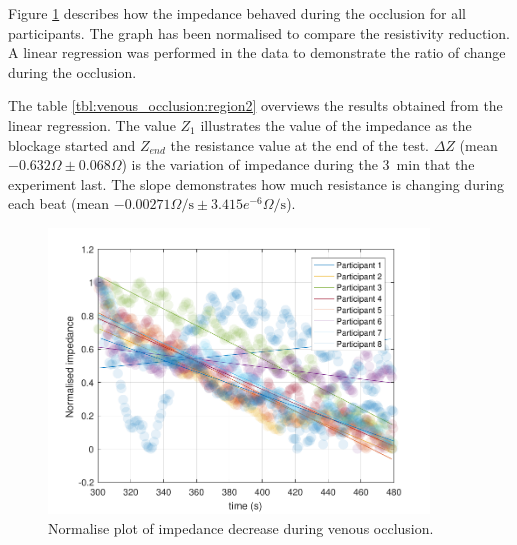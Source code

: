 Figure \ref{fig:normalise:venous_occlusion} describes how the impedance behaved during the occlusion for all participants. The graph has been normalised to compare the resistivity reduction.  A linear regression was performed in the data to demonstrate the ratio of change during the occlusion.  

The table \ref{tbl:venous_occlusion:region2} overviews the results obtained from the linear regression. The value $Z_1$ illustrates the value of the impedance as the blockage started and $Z_{end}$ the resistance value at the end of the test.  $\Delta Z$ (mean $-0.632 \Omega \pm0.068\Omega$) is the variation of impedance during the \SI{3}{\minute} that the experiment last.  The slope demonstrates how much resistance is changing during each beat  (mean $-0.00271\Omega\textrm{/s}\pm3.415e^{-6}\Omega\textrm{/s}$). 

\begin{figure}
	\centering
	\includegraphics[width=0.9\textwidth,height=0.9\textheight,keepaspectratio]{figure3}    
	\caption{Normalise plot of impedance decrease during venous occlusion.}
	\label{fig:normalise:venous_occlusion}
\end{figure}

